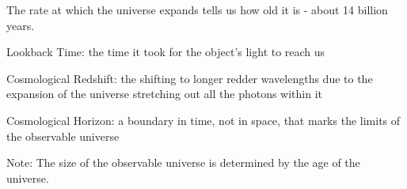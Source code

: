 \documentclass[12pt]{article}
\begin{document}
The rate at which the universe expands tells us how old it is - about 14 billion years. 
\begin{definition} Lookback Time: the time it took for the object's light to reach us \end{definition} 
\begin{definition} Cosmological Redshift: the shifting to longer redder wavelengths due to the expansion of the universe stretching out all the photons within it \end{definition} 
\begin{definition} Cosmological Horizon: a boundary in time, not in space, that marks the limits of the observable universe \end{definition} 
Note: The size of the observable universe is determined by the age of the universe. 
\end{document}
